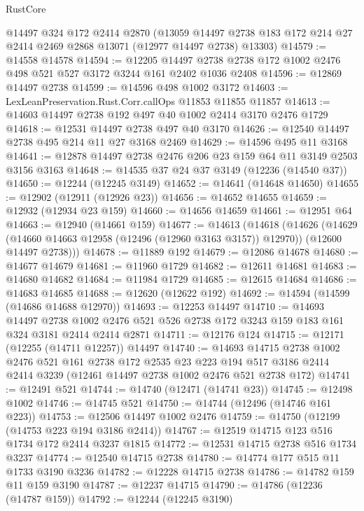 \begin{lexlean}{RustCore}
\begin{coremodule}
    @14497
    @324
    @172
    @2414
    @2870
    (@13059 @14497 @2738 @183 @172 @214 @27 @2414 @2469 @2868 @13071 (@12977 @14497 @2738) @13303)
@14579 := @14558 @14578
@14594 := @12205
    @14497
    @2738
    @2738
    @172
    @1002
    @2476
    @498
    @521
    @527
    @3172
    @3244
    @161
    @2402
    @1036
    @2408
@14596 := @12869 @14497 @2738
@14599 := @14596 @498 @1002 @3172
@14603 := LexLeanPreservation.Rust.Corr.callOps @11853 @11855 @11857
@14613 := @14603 @14497 @2738 @192 @497 @40 @1002 @2414 @3170 @2476 @1729
@14618 := @12531 @14497 @2738 @497 @40 @3170
@14626 := @12540 @14497 @2738 @495 @214 @11 @27 @3168 @2469
@14629 := @14596 @495 @11 @3168
@14641 := @12878 @14497 @2738 @2476 @206 @23 @159 @64 @11 @3149 @2503 @3156 @3163
@14648 := @14535 @37 @24 @37 @3149 (@12236 (@14540 @37))
@14650 := @12244 (@12245 @3149)
@14652 := @14641 (@14648 @14650)
@14655 := @12902 (@12911 (@12926 @23))
@14656 := @14652 @14655
@14659 := @12932 (@12934 @23 @159)
@14660 := @14656 @14659
@14661 := @12951 @64
@14663 := @12940 (@14661 @159)
@14677 := @14613
    (@14618
      (@14626
        (@14629 (@14660 @14663 @12958 (@12496 (@12960 @3163 @3157)) @12970))
        (@12600 @14497 @2738)))
@14678 := @11889 @192
@14679 := @12086 @14678
@14680 := @14677 @14679
@14681 := @11960 @1729
@14682 := @12611 @14681
@14683 := @14680 @14682
@14684 := @11984 @1729
@14685 := @12615 @14684
@14686 := @14683 @14685
@14688 := @12620 (@12622 @192)
@14692 := @14594 (@14599 (@14686 @14688 @12970))
@14693 := @12253 @14497
@14710 := @14693
    @14497
    @2738
    @1002
    @2476
    @521
    @526
    @2738
    @172
    @3243
    @159
    @183
    @161
    @324
    @3181
    @2414
    @2414
    @2871
@14711 := @12176 @124
@14715 := @12171 (@12255 (@14711 @12257)) @14497
@14740 := @14693
    @14715
    @2738
    @1002
    @2476
    @521
    @161
    @2738
    @172
    @2535
    @23
    @223
    @194
    @517
    @3186
    @2414
    @2414
    @3239
    (@12461 @14497 @2738 @1002 @2476 @521 @2738 @172)
@14741 := @12491 @521
@14744 := @14740 (@12471 (@14741 @23))
@14745 := @12498 @1002
@14746 := @14745 @521
@14750 := @14744 (@12496 (@14746 @161 @223))
@14753 := @12506 @14497 @1002 @2476
@14759 := @14750 (@12199 (@14753 @223 @194 @3186 @2414))
@14767 := @12519 @14715 @123 @516 @1734 @172 @2414 @3237 @1815
@14772 := @12531 @14715 @2738 @516 @1734 @3237
@14774 := @12540 @14715 @2738
@14780 := @14774 @177 @515 @11 @1733 @3190 @3236
@14782 := @12228 @14715 @2738
@14786 := @14782 @159 @11 @159 @3190
@14787 := @12237 @14715
@14790 := @14786 (@12236 (@14787 @159))
@14792 := @12244 (@12245 @3190)

\end{coremodule}
\end{lexlean}

